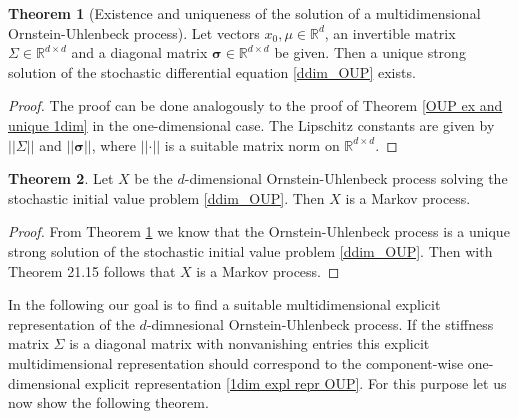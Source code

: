 \documentclass[11pt,titlepage]{article}
\newcommand{\R}{\mathbb{R}} %
\newcommand{\abs}[1]{{\left| #1 \right|}}
\theoremstyle{definition}
\newtheorem{theorem}{Theorem}[section]
\theoremstyle{remark}
\begin{document}
	\begin{theorem}[Existence and uniqueness of the solution of a multidimensional Ornstein-Uhlenbeck process]\label{multdim OUP ex and un}
		Let vectors $x_0,\mu\in\R^d$, an invertible matrix $\Sigma\in\R^{d\times d}$ and a 
		diagonal matrix $\boldsymbol{\sigma}\in\R^{d\times d}$ be given. Then a unique strong solution of the stochastic 
		differential equation \ref{ddim_OUP} exists.
	\end{theorem}

	\begin{proof}
		The proof can be done analogously to the proof of Theorem \ref{OUP ex and unique 1dim} in the one-dimensional case. The Lipschitz constants are given by $\abs{\abs{\Sigma}}$ and $\abs{\abs{\boldsymbol{\sigma}}}$, where $\abs{\abs{\cdot}}$ is 
		a suitable matrix norm on $\R^{d\times d}$.
	\end{proof}

	\begin{theorem}\label{OUP is markovian}
		Let $X$ be the $d$-dimensional Ornstein-Uhlenbeck process solving the stochastic initial value problem \ref{ddim_OUP}. Then $X$ is a Markov process.
	\end{theorem}
	
	\begin{proof}
		From Theorem \ref{multdim OUP ex and un} we know that the Ornstein-Uhlenbeck process is a 
		unique strong solution of the stochastic initial value problem \ref{ddim_OUP}. Then 
		with Theorem 21.15 \cite{Pfaffelhuber2020} follows that $X$ is a Markov process.
	\end{proof}
	
	In the following our goal is to find a suitable multidimensional explicit representation of the $d$-dimnesional Ornstein-Uhlenbeck process. If the stiffness matrix $\Sigma$ is a diagonal matrix with nonvanishing entries this explicit multidimensional representation should correspond to the component-wise one-dimensional explicit representation \ref{1dim expl repr OUP}. For this purpose let us now show the following theorem.
	
\end{document}
